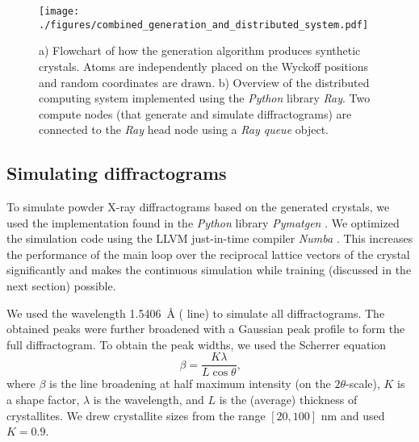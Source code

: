 
    \begin{figure}[!htb] 
    \centering
    \texttt{[image: ./figures/combined\_generation\_and\_distributed\_system.pdf]}
    \caption{a) Flowchart of how the generation algorithm produces synthetic
    crystals. Atoms are independently placed on the Wyckoff positions and random
    coordinates are drawn. b) Overview of the distributed computing system
    implemented using the \emph{Python} library
    \emph{Ray}\supercite{moritzRayDistributedFramework2018a}. Two compute nodes
    (that generate and simulate diffractograms) are connected to the \emph{Ray}
    head node using a \emph{Ray queue} object.}
    \label{fig:generation_and_distributed}
    \end{figure}

    \subsection{Simulating diffractograms} \label{sec:simulation} 

    To simulate powder X-ray diffractograms based on the generated crystals, we used
    the implementation found in the \emph{Python} library \emph{Pymatgen}
    \supercite{ongPythonMaterialsGenomics2013}. We optimized the simulation code
    using the LLVM just-in-time compiler \emph{Numba}
    \supercite{lamNumbaLLVMbasedPython2015}. This increases the performance of
    the main loop over the reciprocal lattice vectors of the crystal
    significantly and makes the continuous simulation while training (discussed
    in the next section) possible.

    We used the wavelength \SI{1.5406}{\angstrom} ( line) to
    simulate all diffractograms. The obtained peaks were further broadened with
    a Gaussian peak profile to form the full diffractogram. To obtain the peak
    widths, we used the Scherrer
    equation\supercite{gilmoreInternationalTablesCrystallography2019}
    \begin{equation}
        \beta=\frac{K \lambda}{L \cos \theta} \text{,} \label{eq:scherrer}
    \end{equation}
    where $ \beta $ is the line broadening at half maximum intensity (on the
    $2\theta$-scale), $K$ is a shape factor, $\lambda$ is the wavelength, and
    $L$ is the (average) thickness of crystallites. We drew crystallite sizes
    from the range $ \left[ 20, 100 \right] $ \si{\nano \metre} and used 
    $K=0.9$.

